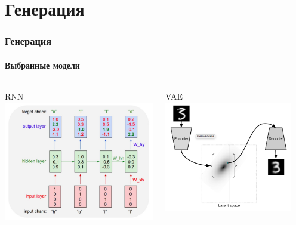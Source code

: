 \documentclass[10pt]{beamer}
\begin{document}
\section{Генерация}
\begin{frame}
\frametitle{Генерация}
\framesubtitle{Выбранные модели}


\begin{columns}[T]
    \begin{column}[T]{0.33\textwidth}
        \begin{center}
            RNN \\
            \includegraphics[width=\textwidth]{images/rnn.png}
        \end{center}
    \end{column}
    \vline
    \begin{column}[T]{0.33\textwidth}
        \begin{center}
            VAE \\
            \includegraphics[width=0.9\textwidth]{images/vae.png}

\end{center}
\end{column}
\end{columns}
\end{frame}
\end{document}
